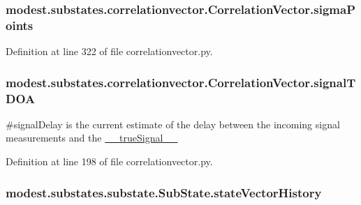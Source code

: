 \subsubsection[{\texorpdfstring{sigma\+Points}{sigmaPoints}}]{\setlength{\rightskip}{0pt plus 5cm}modest.\+substates.\+correlationvector.\+Correlation\+Vector.\+sigma\+Points}\hypertarget{classmodest_1_1substates_1_1correlationvector_1_1CorrelationVector_a9f152d079f5c60b8033c9c83e6f2174b}{}\label{classmodest_1_1substates_1_1correlationvector_1_1CorrelationVector_a9f152d079f5c60b8033c9c83e6f2174b}


Definition at line 322 of file correlationvector.\+py.

\subsubsection[{\texorpdfstring{signal\+T\+D\+OA}{signalTDOA}}]{\setlength{\rightskip}{0pt plus 5cm}modest.\+substates.\+correlationvector.\+Correlation\+Vector.\+signal\+T\+D\+OA}\hypertarget{classmodest_1_1substates_1_1correlationvector_1_1CorrelationVector_a95b97079287af509a5132e15e6107781}{}\label{classmodest_1_1substates_1_1correlationvector_1_1CorrelationVector_a95b97079287af509a5132e15e6107781}


\#signal\+Delay is the current estimate of the delay between the incoming signal measurements and the \hyperlink{classmodest_1_1substates_1_1correlationvector_1_1CorrelationVector_af2f52cea1c695f36dd100f529c322e94}{\+\_\+\+\_\+true\+Signal\+\_\+\+\_\+} 



Definition at line 198 of file correlationvector.\+py.

\subsubsection[{\texorpdfstring{state\+Vector\+History}{stateVectorHistory}}]{\setlength{\rightskip}{0pt plus 5cm}modest.\+substates.\+substate.\+Sub\+State.\+state\+Vector\+History\hspace{0.3cm}{\ttfamily [inherited]}}\hypertarget{classmodest_1_1substates_1_1substate_1_1SubState_a38c12c9d0899bc1161f3502b584517a2}{}\label{classmodest_1_1substates_1_1substate_1_1SubState_a38c12c9d0899bc1161f3502b584517a2}


